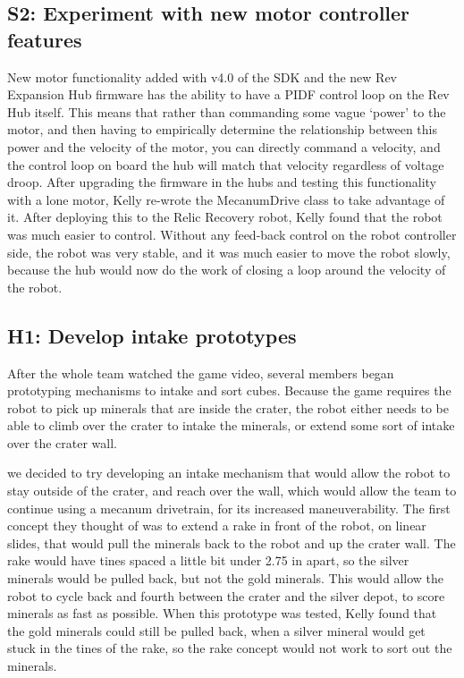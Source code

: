\documentclass{article}
\begin{document}
\subsection{S2: Experiment with new motor controller features}

New motor functionality added with v4.0 of the SDK and the new Rev Expansion Hub firmware has the ability to have a PIDF control loop on the Rev Hub itself. This means that rather than commanding some vague `power' to the motor, and then having to empirically determine the relationship between this power and the velocity of the motor, you can directly command a velocity, and the control loop on board the hub will match that velocity regardless of voltage droop. After upgrading the firmware in the hubs and testing this functionality with a lone motor, Kelly re-wrote the MecanumDrive class to take advantage of it. After deploying this to the Relic Recovery robot, Kelly found that the robot was much easier to control. Without any feed-back control on the robot controller side, the robot was very stable, and it was much easier to move the robot slowly, because the hub would now do the work of closing a loop around the velocity of the robot.\subsection{H1: Develop intake prototypes}

After the whole team watched the game video, several members began prototyping mechanisms to intake and sort cubes. Because the game requires the robot to pick up minerals that are inside the crater, the robot either needs to be able to climb over the crater to intake the minerals, or extend some sort of intake over the crater wall. 

we decided to try developing an intake mechanism that would allow the robot to stay outside of the crater, and reach over the wall, which would allow the team to continue using a mecanum drivetrain, for its increased maneuverability. The first concept they thought of was to extend a rake in front of the robot, on linear slides, that would pull the minerals back to the robot and up the crater wall. The rake would have tines spaced a little bit under 2.75 in apart, so the silver minerals would be pulled back, but not the gold minerals. This would allow the robot to cycle back and fourth between the crater and the silver depot, to score minerals as fast as possible. When this prototype was tested, Kelly found that the gold minerals could still be pulled back, when a silver mineral would get stuck in the tines of the rake, so the rake concept would not work to sort out the minerals. 
\end{document}
